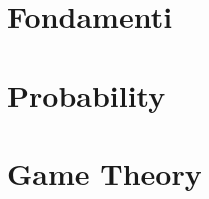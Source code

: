 \documentclass[a4paper,10pt]{book}
\begin{document}
  \tableofcontents

  
  \part{Fondamenti}

  \part{Probability}
  
  
  \part{Game Theory}
  
  
 
  \cleardoublepage

  
\end{document}
